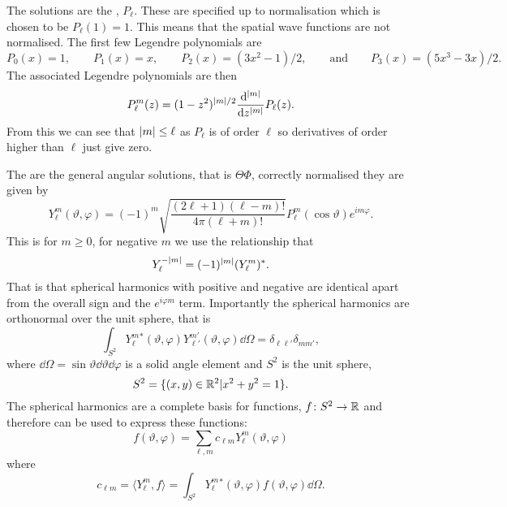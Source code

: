\documentclass[a4paper]{article}
\newcommand{\st}{\vert}
\begin{document}
    The solutions are the , \(P_\ell\).
    These are specified up to normalisation which is chosen to be \(P_\ell(1) = 1\).
    This means that the spatial wave functions are not normalised.
    The first few Legendre polynomials are
    \[P_0(x) = 1, \qquad P_1(x) = x, \qquad P_2(x) = (3x^2 - 1)/2, \qquad\text{and}\qquad P_3(x) = (5x^3 - 3x)/2.\]
    The associated Legendre polynomials are then
    \[P_\ell^m(z) = (1 - z^2)^{\abs{m}/2}\dv[\abs{m}]{z}P_\ell(z).\]
    From this we can see that \(\abs{m} \le \ell\) as \(P_\ell\) is of order \(\ell\) so derivatives of order higher than \(\ell\) just give zero.
    
    The  are the general angular solutions, that is \(\Theta\Phi\), correctly normalised they are given by
    \[Y_\ell^m(\vartheta, \varphi) = (-1)^m\sqrt{\frac{(2\ell + 1)(\ell - m)!}{4\pi(\ell + m)!}} P_\ell^m(\cos\vartheta)e^{im\varphi}.\]
    This is for \(m \ge 0\), for negative \(m\) we use the relationship that
    \[Y_\ell^{-\abs{m}} = (-1)^{\abs{m}}(Y_\ell^m)^*.\]
    That is that spherical harmonics with positive and negative are identical apart from the overall sign and the \(e^{i\varphi m}\) term.
    Importantly the spherical harmonics are orthonormal over the unit sphere, that is
    \[\int_{S^2}Y_\ell^m{^*}(\vartheta, \varphi)Y_{\ell'}^{m'}(\vartheta, \varphi) \dd{\Omega} = \delta_{\ell\ell'}\delta_{mm'},\]
    where \(\dd{\Omega} = \sin\vartheta\dd{\vartheta}\dd{\varphi}\) is a solid angle element and \(S^2\) is the unit sphere,
    \[S^2 = \{(x, y)\in\reals^2\st x^2 + y^2 = 1\}.\]
    The spherical harmonics are a complete basis for functions, \(f\colon S^2\to \mathbb{R}\) and therefore can be used to express these functions:
    \[f(\vartheta, \varphi) = \sum_{\ell, m}c_{\ell m}Y_\ell^m(\vartheta, \varphi)\]
    where
    \[c_{\ell m} = \langle Y_\ell^m , f \rangle = \int_{S^2} Y_\ell^m{^*}(\vartheta, \varphi) f(\vartheta, \varphi) \dd{\Omega}.\]
\end{document}

